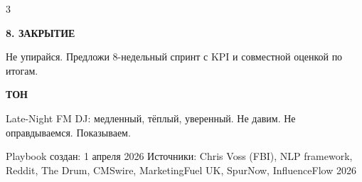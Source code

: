 \documentclass[11pt,a4paper]{article}
\newcommand{\minititle}[1]{{\sansfont\bfseries\fontsize{9.5}{11}\selectfont\color{rose}\MakeUppercase{#1}}}
\begin{document}
\begin{multicols}{3}
\vspace{2.5mm}
\begin{softbox}[colback=paperwhite]
\minititle{8. Закрытие}\par
Не упирайся. Предложи 8-недельный спринт с KPI и совместной оценкой по итогам.
\end{softbox}

\vspace{2.5mm}
\begin{softbox}[colback=paperwhite]
\minititle{Тон}\par
Late-Night FM DJ: медленный, тёплый, уверенный. Не давим. Не оправдываемся. Показываем.
\end{softbox}
\end{multicols}

\vspace{4mm}

\begin{glassbox}
{\color{muted}\sansfont\fontsize{9.5}{12}\selectfont
Playbook создан: 1 апреля 2026 \hfill
Источники: Chris Voss (FBI), NLP framework, Reddit, The Drum, CMSwire, MarketingFuel UK, SpurNow, InfluenceFlow 2026
}
\end{glassbox}
\end{document}
